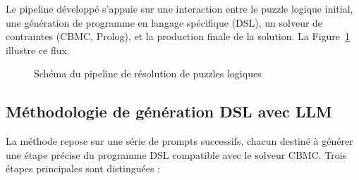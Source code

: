 \documentclass[a4paper,11pt]{article}
\begin{document}
Le pipeline développé s'appuie sur une interaction entre le puzzle logique initial, une génération de programme en langage spécifique (DSL), un solveur de contraintes (CBMC, Prolog), et la production finale de la solution. La Figure~\ref{fig:pipeline} illustre ce flux.


\begin{figure}[h!]
\centering
{}
\caption{Schéma du pipeline de résolution de puzzles logiques}
\label{fig:pipeline}
\end{figure}

\subsection{Méthodologie de génération DSL avec LLM}

La méthode repose sur une série de prompts successifs, chacun destiné à générer une étape précise du programme DSL compatible avec le solveur CBMC. Trois étapes principales sont distinguées :
\end{document}
